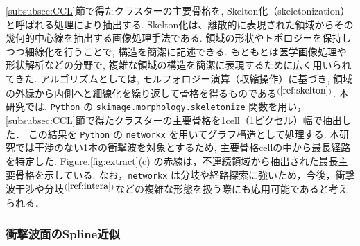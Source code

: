 \documentclass[a4j]{jarticle}
\begin{document}
\ref{subsubsec:CCL}節で得たクラスターの主要骨格を, Skelton化（skeletonization）と呼ばれる処理により抽出する.
Skelton化は、離散的に表現された領域からその幾何的中心線を抽出する画像処理手法である. 
領域の形状やトポロジーを保持しつつ細線化を行うことで, 構造を簡潔に記述できる.
もともとは医学画像処理や形状解析などの分野で, 複雑な領域の構造を簡潔に表現するために広く用いられてきた.
アルゴリズムとしては, モルフォロジー演算（収縮操作）に基づき, 領域の外縁から内側へと細線化を繰り返して骨格を得るものである$^{(\ref{ref:skelton})}$.
本研究では, \texttt{Python} の \texttt{skimage.morphology.skeletonize} 関数を用い，\ref{subsubsec:CCL}節で得たクラスターの主要骨格を1cell（1ピクセル）幅で抽出した．
この結果を \texttt{Python} の \texttt{networkx} を用いてグラフ構造として処理する.
本研究では干渉のない1本の衝撃波を対象とするため, 主要骨格cellの中から最長経路を特定した.
Figure.\ref{fig:extract}(c) の赤線は，不連続領域から抽出された最長主要骨格を示している.
なお，\texttt{networkx} は分岐や経路探索に強いため，今後，衝撃波干渉や分岐$^{(\ref{ref:intera})}$などの複雑な形態を扱う際にも応用可能であると考えられる．

\subsubsection{衝撃波面のSpline近似} \label{subsubsec:spline}
\mbox{}\\[-1.0ex]
\end{document}
